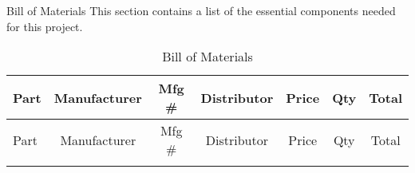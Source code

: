 \begin{customAppendixPage}{Bill of Materials}
This section contains a list of the essential components needed for this project.
\end{customAppendixPage}
\renewcommand*{\thepage}{\thesection-\arabic{page}}

 \begin{landscape}
{\small
\begin{center}
 \begin{longtable}{|p{1.5in}|c|c|c|c|c|c|}
    \caption{Bill of Materials   \label{tab:bom}} \\
     \hline
     \rowcolor{Gray}
         Part  & Manufacturer & Mfg \# & Distributor & Price & Qty   & Total \\
    \hline
     
 \endfirsthead   
	\hline
     \rowcolor{Gray}
    Part  & Manufacturer & Mfg \# & Distributor& Price & Qty   & Total \\
    \hline


 \endhead
    \endfoot 
    

\end{longtable}
\end{center}}
\end{landscape}
